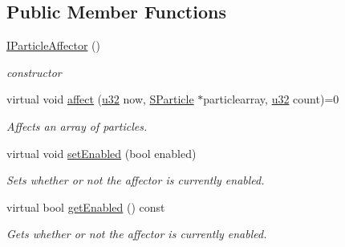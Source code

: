 \subsection*{Public Member Functions}
\begin{DoxyCompactItemize}
\item 
\mbox{\label{classirr_1_1scene_1_1IParticleAffector_a060c7080c8c619e9bb2d35c7ac981889}} 
\hyperlink{classirr_1_1scene_1_1IParticleAffector_a060c7080c8c619e9bb2d35c7ac981889}{I\+Particle\+Affector} ()
\begin{DoxyCompactList}\small\item\em constructor \end{DoxyCompactList}\item 
virtual void \hyperlink{classirr_1_1scene_1_1IParticleAffector_a87fb9116bb1a4d3ea075c59f3e2d1dbc}{affect} (\hyperlink{namespaceirr_a0416a53257075833e7002efd0a18e804}{u32} now, \hyperlink{structirr_1_1scene_1_1SParticle}{S\+Particle} $\ast$particlearray, \hyperlink{namespaceirr_a0416a53257075833e7002efd0a18e804}{u32} count)=0
\begin{DoxyCompactList}\small\item\em Affects an array of particles. \end{DoxyCompactList}\item 
\mbox{\label{classirr_1_1scene_1_1IParticleAffector_aa3715a5686640a180462ad7843aaff0b}} 
virtual void \hyperlink{classirr_1_1scene_1_1IParticleAffector_aa3715a5686640a180462ad7843aaff0b}{set\+Enabled} (bool enabled)
\begin{DoxyCompactList}\small\item\em Sets whether or not the affector is currently enabled. \end{DoxyCompactList}\item 
\mbox{\label{classirr_1_1scene_1_1IParticleAffector_a5665add84311a13c2dbfed3a77670cae}} 
virtual bool \hyperlink{classirr_1_1scene_1_1IParticleAffector_a5665add84311a13c2dbfed3a77670cae}{get\+Enabled} () const
\begin{DoxyCompactList}\small\item\em Gets whether or not the affector is currently enabled. \end{DoxyCompactList}\item 
\mbox{\label{classirr_1_1scene_1_1IParticleAffector_add5652cd7dabb91342497fed776e2557}} 

\end{DoxyCompactItemize}
